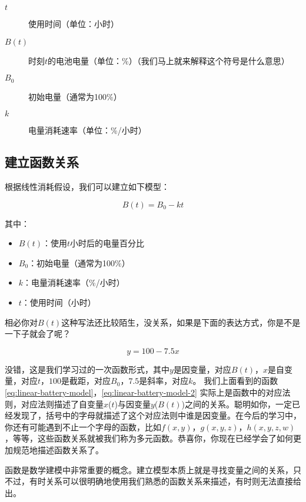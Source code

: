 \begin{description}
    \item[$t$] 使用时间（单位：小时）
    \item[$B(t)$] 时刻$t$的电池电量（单位：\%）（我们马上就来解释这个符号是什么意思）
    \item[$B_0$] 初始电量（通常为100\%）
    \item[$k$] 电量消耗速率（单位：\%/小时）
\end{description}

\subsection{建立函数关系}

根据线性消耗假设，我们可以建立如下模型：

\begin{definitionbox}[title=线性电池消耗模型]
\begin{equation}
B(t) = B_0 - kt
\end{equation}\label{eq:linear-battery-model}

其中：
\begin{itemize}
    \item $B(t)$：使用$t$小时后的电量百分比
    \item $B_0$：初始电量（通常为100\%）
    \item $k$：电量消耗速率（\%/小时）
    \item $t$：使用时间（小时）
\end{itemize}
\end{definitionbox}

相必你对$B(t)$这种写法还比较陌生，没关系，如果是下面的表达方式，你是不是一下子就会了呢？

\begin{equation}
y = 100 - 7.5x
\end{equation}\label{eq:linear-battery-model-2}

没错，这是我们学习过的一次函数形式，其中$y$是因变量，对应$B(t)$，$x$是自变量，对应$t$，$100$是截距，对应$B_0$，$7.5$是斜率，对应$k$。 我们上面看到的函数\eqref{eq:linear-battery-model}，\eqref{eq:linear-battery-model-2}
实际上是函数中的对应法则，对应法则描述了自变量$x$($t$)与因变量$y$($B(t)$)之间的关系。聪明如你，一定已经发现了，括号中的字母就描述了这个对应法则中谁是因变量。在今后的学习中，你还有可能遇到不止一个字母的函数，比如$f(x,y)$，$g(x,y,z)$，$h(x,y,z,w)$，等等，这些函数关系就被我们称为多元函数。恭喜你，你现在已经学会了如何更加规范地描述函数关系了。

\begin{warningbox}[title=关于函数]
    函数是数学建模中非常重要的概念。建立模型本质上就是寻找变量之间的关系，只不过，有时关系可以很明确地使用我们熟悉的函数关系来描述，有时则无法直接给出。
\end{warningbox}


